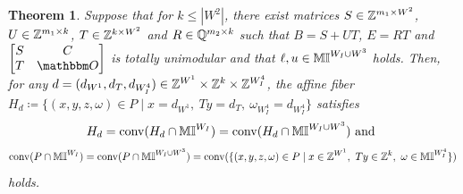 \documentclass[pdflatex,sn-mathphys-num]{sn-jnl}%
\theoremstyle{thmstyleone}%
\newtheorem{theorem}[theorem]{Theorem}
\theoremstyle{thmstylethree}%
\theoremstyle{thmstyletwo}%
\newcommand{\conv}{\mathrm{conv}}
\begin{document}
\begin{theorem}
\label{thm_atu_milp_integral}
Suppose that for $k \leq |W^2|$, there exist matrices $S \in \mathbb{Z}^{m_1\times W^2}$, $U\in \mathbb{Z}^{m_1 \times k}$, $T\in \mathbb{Z}^{k \times W^2}$  and $R\in \mathbb{Q}^{m_2\times k}$ such that $B= S + U T$, $E=RT$ and  
$\begin{bmatrix}
    S & C\\
    T & \zerovec
\end{bmatrix}$ is totally unimodular and that $\ell,u \in \mathbb{MI}^{W_I \cup W^3}$ holds. Then, for any $
    d = (d_{W^1}, d_T, d_{W^4_I}) \in \mathbb{Z}^{W^1} \times \mathbb{Z}^{k} \times \mathbb{Z}^{W^4_I}$, the affine fiber $H_d \coloneqq \{(x,y,z,\omega) \in P \mid x = d_{W^1},~ T y = d_T, ~\omega_{W^4_I} = d_{W^4_I} \}$ satisfies 
    \begin{equation*}
        H_d = \conv(H_d \cap \M^{W_I}) = \conv(H_d \cap \M^{W_I \cup W^3}) \text{ and }
    \end{equation*} 
    \begin{equation*}
        \conv(P\cap \M^{W_I}) = \conv(P\cap\M^{W_I\cup W^3})  = \conv(\{(x,y,z,\omega)\in P \mid x\in \Z^{W^1},~T y \in \Z^k,~ \omega \in \M^{W^4_I} \})
    \end{equation*} holds.
\end{theorem}
\end{document}
